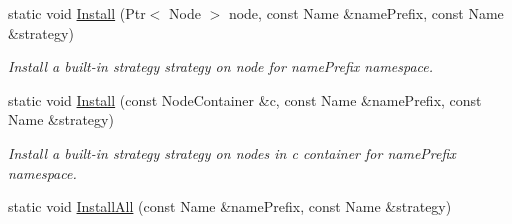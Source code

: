 \begin{DoxyCompactItemize}
\item 
static void \hyperlink{classns3_1_1ndn_1_1StrategyChoiceHelper_a8772c04eb91b1b57630f8149bf874b4e}{Install} (Ptr$<$ Node $>$ node, const Name \&name\+Prefix, const Name \&strategy)\hypertarget{classns3_1_1ndn_1_1StrategyChoiceHelper_a8772c04eb91b1b57630f8149bf874b4e}{}\label{classns3_1_1ndn_1_1StrategyChoiceHelper_a8772c04eb91b1b57630f8149bf874b4e}

\begin{DoxyCompactList}\small\item\em Install a built-\/in strategy {\ttfamily strategy} on {\ttfamily node} for {\ttfamily name\+Prefix} namespace. \end{DoxyCompactList}\item 
static void \hyperlink{classns3_1_1ndn_1_1StrategyChoiceHelper_a166064669d862c000e4b3996f476dde9}{Install} (const Node\+Container \&c, const Name \&name\+Prefix, const Name \&strategy)\hypertarget{classns3_1_1ndn_1_1StrategyChoiceHelper_a166064669d862c000e4b3996f476dde9}{}\label{classns3_1_1ndn_1_1StrategyChoiceHelper_a166064669d862c000e4b3996f476dde9}

\begin{DoxyCompactList}\small\item\em Install a built-\/in strategy {\ttfamily strategy} on nodes in {\ttfamily c} container for {\ttfamily name\+Prefix} namespace. \end{DoxyCompactList}\item 
static void \hyperlink{classns3_1_1ndn_1_1StrategyChoiceHelper_a726f392b22b0acb1e450e21918240e50}{Install\+All} (const Name \&name\+Prefix, const Name \&strategy)\hypertarget{classns3_1_1ndn_1_1StrategyChoiceHelper_a726f392b22b0acb1e450e21918240e50}{}\label{classns3_1_1ndn_1_1StrategyChoiceHelper_a726f392b22b0acb1e450e21918240e50}


\end{DoxyCompactItemize}
